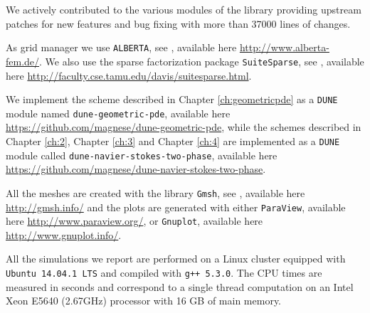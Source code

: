 We actively contributed to the various modules of the library providing
upstream patches for new features and bug fixing with more than 37000 lines of
changes.

As grid manager we use \verb|ALBERTA|, see \cite{Alberta}, available here
\url{http://www.alberta-fem.de/}. We also use the sparse factorization
package \verb|SuiteSparse|, see \cite{Davis04}, available here
\url{http://faculty.cse.tamu.edu/davis/suitesparse.html}.

We implement the scheme described in Chapter \ref{ch:geometricpde} as a
\verb|DUNE| module named \verb|dune-geometric-pde|, available here
\url{https://github.com/magnese/dune-geometric-pde}, while the schemes described
in Chapter \ref{ch:2}, Chapter \ref{ch:3} and Chapter \ref{ch:4} are implemented
as a \verb|DUNE| module called \verb|dune-navier-stokes-two-phase|, available
here \url{https://github.com/magnese/dune-navier-stokes-two-phase}.

All the meshes are created with the library \verb|Gmsh|, see
\cite{GeuzaineR09}, available here \url{http://gmsh.info/} and the plots are
generated with either \verb|ParaView|, available here
\url{http://www.paraview.org/}, or \verb|Gnuplot|, available here
\url{http://www.gnuplot.info/}.

All the simulations we report are performed on a Linux cluster equipped with
\verb|Ubuntu 14.04.1 LTS| and compiled with \verb|g++ 5.3.0|. The CPU times
are measured in seconds and correspond to a single thread computation on an
Intel Xeon E5640 (2.67GHz) processor with 16 GB of main memory.
